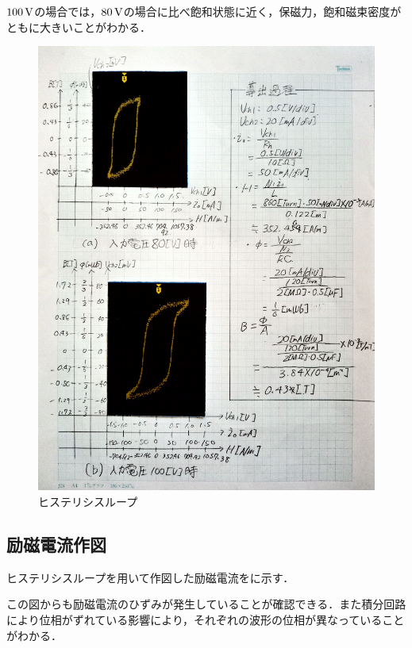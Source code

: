 $100\,\rm{V}$の場合では，$80\,\rm{V}$の場合に比べ飽和状態に近く，保磁力，飽和磁束密度がともに大きいことがわかる．
\begin{figure}[h]
	\centering
	\includegraphics[scale=0.8]{./data/graph/2.pdf}
	\caption{ヒステリシスループ}
	\label{fig:2}
\end{figure}

\subsection{励磁電流作図}
ヒステリシスループを用いて作図した励磁電流をに示す．

この図からも励磁電流のひずみが発生していることが確認できる．また積分回路により位相がずれている影響により，それぞれの波形の位相が異なっていることがわかる．

